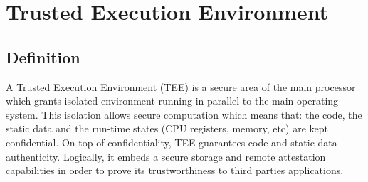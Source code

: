 \documentclass[../main.tex]{subfiles}
\begin{document}
\section{Trusted Execution Environment}
\label{section:theoric:tee}


\subsection{Definition}
\label{section:theoric:tee_definition}
\par A Trusted Execution Environment (TEE) is a secure area of the main processor which grants isolated environment running in parallel to the main operating system. This isolation allows secure computation which means that: the code, the static data and the run-time states (CPU registers, memory, etc) are kept confidential. On top of confidentiality, TEE guarantees code and static data authenticity. Logically, it embeds a secure storage and remote attestation capabilities in order to prove its trustworthiness to third parties applications.
\end{document}
